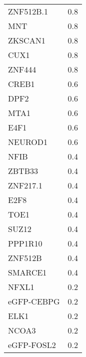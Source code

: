 \begin{longtable}{lr}
  ZNF512B.1 &    0.8 \\
        MNT &    0.8 \\
    ZKSCAN1 &    0.8 \\
       CUX1 &    0.8 \\
     ZNF444 &    0.8 \\
      CREB1 &    0.6 \\
       DPF2 &    0.6 \\
       MTA1 &    0.6 \\
       E4F1 &    0.6 \\
    NEUROD1 &    0.6 \\
       NFIB &    0.4 \\
     ZBTB33 &    0.4 \\
   ZNF217.1 &    0.4 \\
       E2F8 &    0.4 \\
       TOE1 &    0.4 \\
      SUZ12 &    0.4 \\
    PPP1R10 &    0.4 \\
    ZNF512B &    0.4 \\
    SMARCE1 &    0.4 \\
      NFXL1 &    0.2 \\
 eGFP-CEBPG &    0.2 \\
       ELK1 &    0.2 \\
      NCOA3 &    0.2 \\
 eGFP-FOSL2 &    0.2 \\
\end{longtable}
